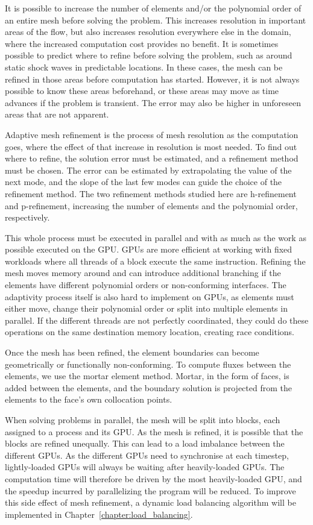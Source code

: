It is possible to increase the number of elements and/or the polynomial order of an entire mesh
before solving the problem. This increases resolution in important areas of the flow, but also
increases resolution everywhere else in the domain, where the increased computation cost provides no
benefit. It is sometimes possible to predict where to refine before solving the problem, such as
around static shock waves in predictable locations. In these cases, the mesh can be refined in those
areas before computation has started. However, it is not always possible to know these areas
beforehand, or these areas may move as time advances if the problem is transient. The error may also
be higher in unforeseen areas that are not apparent.

Adaptive mesh refinement is the process of mesh resolution as the computation goes, where the effect
of that increase in resolution is most needed. To find out where to refine, the solution error must
be estimated, and a refinement method must be chosen. The error can be estimated by extrapolating
the value of the next mode, and the slope of the last few modes can guide the choice of the
refinement method. The two refinement methods studied here are h-refinement and p-refinement,
increasing the number of elements and the polynomial order, respectively. 

This whole process must be executed in parallel and with as much as the work as possible executed on
the GPU. GPUs are more efficient at working with fixed workloads where all threads of a block
execute the same instruction. Refining the mesh moves memory around and can introduce additional
branching if the elements have different polynomial orders or non-conforming interfaces. The
adaptivity process itself is also hard to implement on GPUs, as elements must either move, change
their polynomial order or split into multiple elements in parallel. If the different threads are not
perfectly coordinated, they could do these operations on the same destination memory location,
creating race conditions.

Once the mesh has been refined, the element boundaries can become geometrically or functionally
non-conforming. To compute fluxes between the elements, we use the mortar element method. Mortar, in
the form of faces, is added between the elements, and the boundary solution is projected from the
elements to the face's own collocation points. 

When solving problems in parallel, the mesh will be split into blocks, each assigned to a process
and its GPU. As the mesh is refined, it is possible that the blocks are refined unequally. This can
lead to a load imbalance between the different GPUs. As the different GPUs need to synchronise at
each timestep, lightly-loaded GPUs will always be waiting after heavily-loaded GPUs. The computation
time will therefore be driven by the most heavily-loaded GPU, and the speedup incurred by
parallelizing the program will be reduced. To improve this side effect of mesh refinement, a dynamic
load balancing algorithm will be implemented in Chapter~\ref{chapter:load_balancing}.

